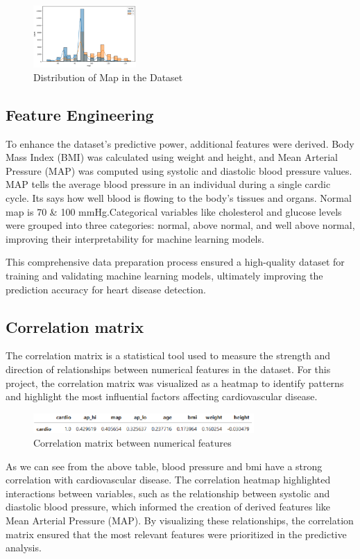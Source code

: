 \documentclass[12pt]{article}
\begin{document}
\begin{figure}[H]
\centering
\captionsetup{font=small}
\includegraphics[width=0.35\textwidth]{graph3.eps}  %
\caption{Distribution of Map in the Dataset}
\label{fig:map}
\end{figure}

\subsection{Feature Engineering}
To enhance the dataset's predictive power, additional features were derived. Body Mass Index (BMI) was calculated using weight and height, and Mean Arterial Pressure (MAP) was computed using systolic and diastolic blood pressure values. MAP tells the average blood pressure in an individual during a single cardic cycle. Its says how well blood is flowing to the body’s tissues and organs. Normal map is 70 \& 100 mmHg.Categorical variables like cholesterol and glucose levels were grouped into three categories: normal, above normal, and well above normal, improving their interpretability for machine learning models.

This comprehensive data preparation process ensured a high-quality dataset for training and validating machine learning models, ultimately improving the prediction accuracy for heart disease detection.

\subsection{Correlation matrix}
 The correlation matrix is a statistical tool used to measure the strength and direction of relationships between numerical features in the dataset. For this project, the correlation matrix was visualized as a heatmap to identify patterns and highlight the most influential factors affecting cardiovascular disease.
\begin{figure}[H]
\centering
\captionsetup{font=small}
\includegraphics[width=0.75\textwidth]{correlation.eps}  
\caption{Correlation matrix between numerical features}
\label{fig:corr}
\end{figure}
As we can see from the above table, blood pressure and bmi have a strong correlation with cardiovascular disease. The correlation heatmap highlighted interactions between variables, such as the relationship between systolic and diastolic blood pressure, which informed the creation of derived features like Mean Arterial Pressure (MAP). By visualizing these relationships, the correlation matrix ensured that the most relevant features were prioritized in the predictive analysis.
\end{document}
